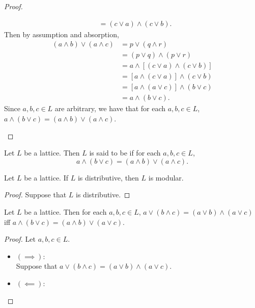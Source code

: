 \documentclass{book}
\begin{document}
\begin{proof}
\begin{enumerate}
\begin{align*}
				& = (c \vee a) \wedge (c \vee b).
			\end{align*}
			Then by assumption and absorption,
			\begin{align*}
				(a \wedge b) \vee (a \wedge c)
				& = p \vee (q \wedge r) \\
				& = (p \vee q) \wedge (p \vee r) \\
				& = a \wedge [(c \vee a) \wedge (c \vee b)] \\
				& = [a \wedge (c \vee a)] \wedge (c \vee b) \\
				& = [a \wedge (a \vee c)] \wedge (b \vee c) \\
				& = a \wedge (b \vee c).
			\end{align*}
			Since $a,b,c \in L$ are arbitrary, we have that for each $a,b,c \in L$, $a \wedge (b \vee c) = (a \wedge b) \vee (a \wedge c)$.
		\end{enumerate}
	\end{proof}
	
	\begin{defn}
		Let $L$ be a lattice. Then $L$ is said to be  if for each $a,b,c \in L$, 
		$$a \wedge (b \vee c) = (a \wedge b) \vee (a \wedge c).$$
	\end{defn}
	
	\begin{ex}
		Let $L$ be a lattice. If $L$ is distributive, then $L$ is modular. 
	\end{ex}
	
	\begin{proof}
		Suppose that $L$ is distributive. 
	\end{proof}
	
	\begin{ex}
		Let $L$ be a lattice. Then for each $a,b,c \in L$, $a \vee (b \wedge c) = (a \vee b) \wedge (a \vee c)$ iff $a \wedge (b \vee c) = (a \wedge b) \vee (a \vee c)$.
	\end{ex}
	
	\begin{proof}
		Let $a,b,c \in L$.
		\begin{itemize}
			\item $(\implies)$: \\
			Suppose that $a \vee (b \wedge c) = (a \vee b) \wedge (a \vee c)$. 
			\item $(\impliedby)$: \\
			
		\end{itemize}
	\end{proof}
	
\end{document}
